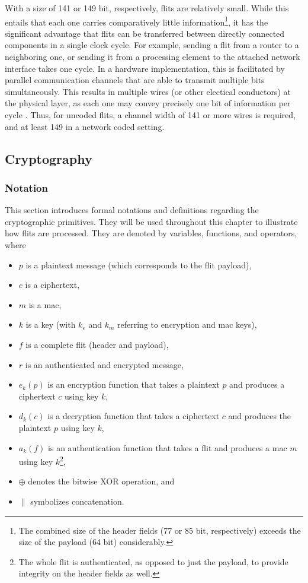 With a size of 141 or 149 bit, respectively, flits are relatively small. While this entails that each one carries comparatively little
information\footnote{The combined size of the header fields (77 or 85 bit, respectively) exceeds the size of the payload (64 bit) considerably.}, it
has the significant advantage that flits can be transferred between directly connected components in a single clock
cycle. For example, sending a flit from a router to a neighboring one, or sending it from a processing element
to the attached network interface takes one cycle. In a hardware implementation, this is facilitated by parallel communication channels that are able
to transmit multiple bits simultaneously. This results in multiple wires (or other electical conductors) at the physical layer, as each one may convey
precisely one bit of information per cycle \cite{wikiparallelcomm}. Thus, for uncoded flits, a channel width of 141 or more wires is required, and at least 149
in a network coded setting.

\subsection{Cryptography}\label{subsec:crypto}
\subsubsection{Notation}\label{subsubsec:cryptonotation}
This section introduces formal notations and definitions regarding the cryptographic primitives. They will be used throughout this chapter to
illustrate how flits are processed. They are denoted by variables, functions, and operators, where
\begin{itemize}
    \item $p$ is a plaintext message (which corresponds to the flit payload),
    \item $c$ is a ciphertext,
    \item $m$ is a \gls{mac},
    \item $k$ is a key (with $k_e$ and $k_m$ referring to encryption and \gls{mac} keys),
    \item $f$ is a complete flit (header and payload),
    \item $r$ is an authenticated and encrypted message,
    \item $e_k(p)$ is an encryption function that takes a plaintext $p$ and produces a ciphertext $c$ using key $k$,
    \item $d_k(c)$ is a decryption function that takes a ciphertext $c$ and produces the plaintext $p$ using key $k$,
    \item $a_k(f)$ is an authentication function that takes a flit and produces a \gls{mac} $m$ using key $k$\footnote{The whole flit is
        authenticated, as opposed to just the payload, to provide integrity on the header fields as well.},
    \item $\oplus$ denotes the bitwise XOR operation, and
    \item $\|$ symbolizes concatenation.
\end{itemize}
\vspace{0.5\baselineskip}

